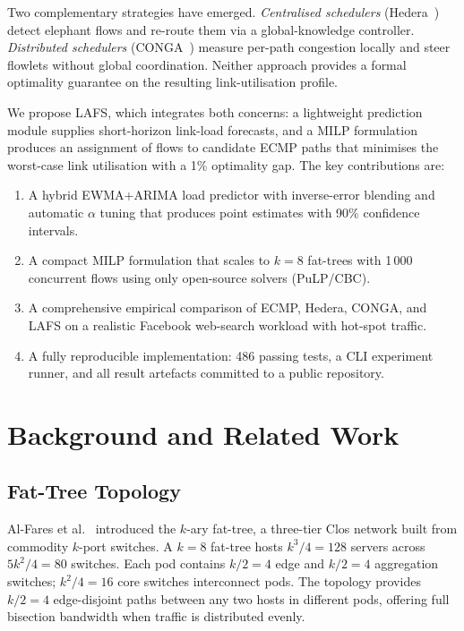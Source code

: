 \documentclass[runningheads]{llncs}
\begin{document}
Two complementary strategies have emerged. \emph{Centralised schedulers} (Hedera~\cite{hedera}) detect elephant flows and re-route them via a global-knowledge controller. \emph{Distributed schedulers} (CONGA~\cite{conga}) measure per-path congestion locally and steer flowlets without global coordination. Neither approach provides a formal optimality guarantee on the resulting link-utilisation profile.

We propose LAFS, which integrates both concerns: a lightweight prediction module supplies short-horizon link-load forecasts, and a MILP formulation produces an assignment of flows to candidate ECMP paths that minimises the worst-case link utilisation with a 1\% optimality gap. The key contributions are:

\begin{enumerate}
  \item A hybrid EWMA+ARIMA load predictor with inverse-error blending and automatic $\alpha$ tuning that produces point estimates with 90\% confidence intervals.
  \item A compact MILP formulation that scales to $k{=}8$ fat-trees with 1\,000 concurrent flows using only open-source solvers (PuLP/CBC).
  \item A comprehensive empirical comparison of ECMP, Hedera, CONGA, and LAFS on a realistic Facebook web-search workload with hot-spot traffic.
  \item A fully reproducible implementation: 486 passing tests, a CLI experiment runner, and all result artefacts committed to a public repository.
\end{enumerate}

\section{Background and Related Work}
\label{sec:background}

\subsection{Fat-Tree Topology}

Al-Fares et al.~\cite{fattree} introduced the $k$-ary fat-tree, a three-tier Clos network built from commodity $k$-port switches. A $k{=}8$ fat-tree hosts $k^3/4 = 128$ servers across $5k^2/4 = 80$ switches. Each pod contains $k/2 = 4$ edge and $k/2 = 4$ aggregation switches; $k^2/4 = 16$ core switches interconnect pods. The topology provides $k/2 = 4$ edge-disjoint paths between any two hosts in different pods, offering full bisection bandwidth when traffic is distributed evenly.
\end{document}
